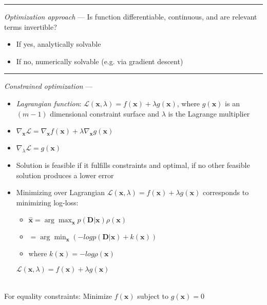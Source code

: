 {\color{lightgray}\hrule height 0.001mm}

\emph{Optimization approach} --- 
Is function differentiable, continuous, and are relevant terms invertible?
\begin{itemize}
    \item If yes, analytically solvable
    \item If no, numerically solvable (e.g. via gradient descent)
\end{itemize}

{\color{lightgray}\hrule height 0.001mm}

\emph{Constrained optimization} --- 
\begin{itemize}
    \item \emph{Lagrangian function}: $\mathcal{L}(\boldsymbol{x},\lambda) = f(\boldsymbol{x}) + \lambda g(\boldsymbol{x})$, where $g(\boldsymbol{x})$ is an $(m-1)$ dimensional constraint surface and $\lambda$ is the Lagrange multiplier
    \item$\nabla_{\boldsymbol{x}} \mathcal{L} = \nabla_{\boldsymbol{x}} f(\boldsymbol{x}) + \lambda \nabla_{\boldsymbol{x}} g(\boldsymbol{x})$
    \item$\nabla_{\lambda} \mathcal{L} = g(\boldsymbol{x})$
    \item Solution is feasible if it fulfills constraints and optimal, if no other feasible solution produces a lower error
    \item Minimizing over Lagrangian $\mathcal{L}(\boldsymbol{x},\lambda) = f(\boldsymbol{x}) + \lambda g(\boldsymbol{x})$ corresponds to minimizing log-loss:
    \begin{itemize}
        \item $\hat{\boldsymbol{x}} = \arg\max_\boldsymbol{x} p(\boldsymbol{D} |\boldsymbol{x}) \rho(\boldsymbol{x}) $ 
        \item $= \arg\min_\boldsymbol{x} (- log p(\boldsymbol{D} |\boldsymbol{x}) + k(\boldsymbol{x}))$
        \item where $k(\boldsymbol{x}) = -log \rho(\boldsymbol{x})$
    \end{itemize}
    $\mathcal{L}(\boldsymbol{x},\lambda) = f(\boldsymbol{x}) + \lambda g(\boldsymbol{x})$
\end{itemize}\\
For equality constraints: Minimize $f(\boldsymbol{x})$ subject to $g(\boldsymbol{x}) = 0$
